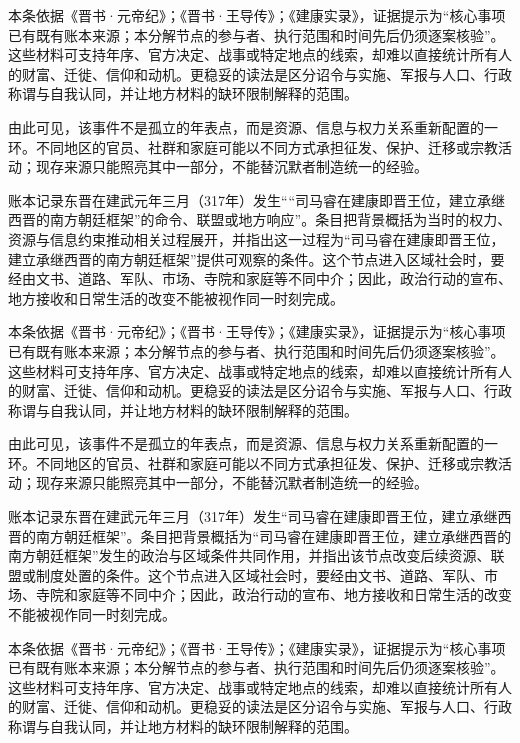 本条依据《晋书·元帝纪》；《晋书·王导传》；《建康实录》，证据提示为“核心事项已有既有账本来源；本分解节点的参与者、执行范围和时间先后仍须逐案核验”。这些材料可支持年序、官方决定、战事或特定地点的线索，却难以直接统计所有人的财富、迁徙、信仰和动机。更稳妥的读法是区分诏令与实施、军报与人口、行政称谓与自我认同，并让地方材料的缺环限制解释的范围。

由此可见，该事件不是孤立的年表点，而是资源、信息与权力关系重新配置的一环。不同地区的官员、社群和家庭可能以不同方式承担征发、保护、迁移或宗教活动；现存来源只能照亮其中一部分，不能替沉默者制造统一的经验。

账本记录东晋在建武元年三月（317年）发生““司马睿在建康即晋王位，建立承继西晋的南方朝廷框架”的命令、联盟或地方响应”。条目把背景概括为当时的权力、资源与信息约束推动相关过程展开，并指出这一过程为“司马睿在建康即晋王位，建立承继西晋的南方朝廷框架”提供可观察的条件。这个节点进入区域社会时，要经由文书、道路、军队、市场、寺院和家庭等不同中介；因此，政治行动的宣布、地方接收和日常生活的改变不能被视作同一时刻完成。

本条依据《晋书·元帝纪》；《晋书·王导传》；《建康实录》，证据提示为“核心事项已有既有账本来源；本分解节点的参与者、执行范围和时间先后仍须逐案核验”。这些材料可支持年序、官方决定、战事或特定地点的线索，却难以直接统计所有人的财富、迁徙、信仰和动机。更稳妥的读法是区分诏令与实施、军报与人口、行政称谓与自我认同，并让地方材料的缺环限制解释的范围。

由此可见，该事件不是孤立的年表点，而是资源、信息与权力关系重新配置的一环。不同地区的官员、社群和家庭可能以不同方式承担征发、保护、迁移或宗教活动；现存来源只能照亮其中一部分，不能替沉默者制造统一的经验。

账本记录东晋在建武元年三月（317年）发生“司马睿在建康即晋王位，建立承继西晋的南方朝廷框架”。条目把背景概括为“司马睿在建康即晋王位，建立承继西晋的南方朝廷框架”发生的政治与区域条件共同作用，并指出该节点改变后续资源、联盟或制度处置的条件。这个节点进入区域社会时，要经由文书、道路、军队、市场、寺院和家庭等不同中介；因此，政治行动的宣布、地方接收和日常生活的改变不能被视作同一时刻完成。

本条依据《晋书·元帝纪》；《晋书·王导传》；《建康实录》，证据提示为“核心事项已有既有账本来源；本分解节点的参与者、执行范围和时间先后仍须逐案核验”。这些材料可支持年序、官方决定、战事或特定地点的线索，却难以直接统计所有人的财富、迁徙、信仰和动机。更稳妥的读法是区分诏令与实施、军报与人口、行政称谓与自我认同，并让地方材料的缺环限制解释的范围。

